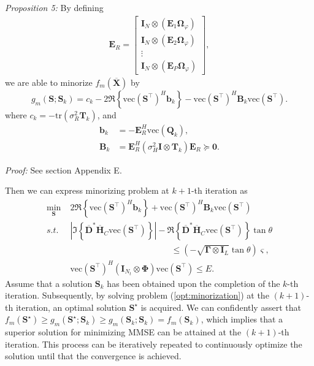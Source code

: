 \documentclass[lettersize,journal]{IEEEtran}
\newcommand{\nocolor}[1]{{\color{black}#1}}
\begin{document}
\textit{Proposition 5:} By defining 
\begin{equation}
\begin{aligned}
    \mathbf{E}_R
    = \begin{bmatrix}
        \mathbf{I}_N\otimes(\mathbf{E}_{1}\mathbf{\Omega}_{\varphi}) \\
        \mathbf{I}_N\otimes(\mathbf{E}_{2}\mathbf{\Omega}_{\varphi}) \\
        \vdots \\
        \mathbf{I}_N\otimes(\mathbf{E}_{P}\mathbf{\Omega}_{\varphi})
    \end{bmatrix},
\end{aligned}
\end{equation}
we are able to minorize $f_m(\overline{\mathbf{X}})$ by
\begin{equation}
    g_m(\mathbf{S};\mathbf{S}_k)=c_k - 2\Re\left\{\text{vec}(\mathbf{S}^{\top})^H\mathbf{b}_k\right\}-\text{vec}(\mathbf{S}^{\top})^H\mathbf{B}_k\text{vec}(\mathbf{S}^{\top}).
\end{equation}
where $c_k=-\text{tr}(\sigma_R^2\mathbf{T}_k)$,  and 
\begin{align}
    \mathbf{b}_k&=-\mathbf{E}_R^H\text{vec}(\mathbf{Q}_k), \label{eq:b}\\
    \mathbf{B}_k&=\mathbf{E}_R^H(\sigma_H^2\mathbf{I}\otimes\mathbf{T}_k)\mathbf{E}_R\succeq\mathbf{0}. \label{eq:B}
\end{align}

\textit{Proof:} \nocolor{See section Appendix E}.

Then we can express minorizing problem at $k+1$-th iteration as
\begin{equation}
\label{opt:minorization}
\begin{aligned}
    \underset{\mathbf{S}}{\min} &\;
    2\Re\left\{\text{vec}(\mathbf{S}^{\top})^H\mathbf{b}_k\right\}+\text{vec}(\mathbf{S}^{\top})^H\mathbf{B}_k\text{vec}(\mathbf{S}^{\top}) \\
    s.t. &\;
    \left| \Im\left\{\overline{\mathbf{D}}^{*}\overline{\mathbf{H}}_C\text{vec}(\mathbf{S}^{\top})\right\} \right| - \Re\left\{\overline{\mathbf{D}}^{*}\overline{\mathbf{H}}_C\text{vec}(\mathbf{S}^{\top})\right\}\tan\theta
    \\ &\qquad\qquad\qquad\qquad\qquad\qquad
    \leq (-\sqrt{\mathbf{\Gamma}\otimes\mathbf{I}_L}\tan\theta)\bm{\varsigma},\\
    &\; \text{vec}(\mathbf{S}^{\top})^H(\mathbf{I}_{N_t}\otimes\mathbf{\Phi})\text{vec}(\mathbf{S}^{\top})\leq E.
\end{aligned}
\end{equation}
Assume that a solution $\mathbf{S}_k$ has been obtained upon the completion of the $k$-th iteration. Subsequently, by solving problem (\ref{opt:minorization}) at the $(k+1)$-th iteration, an optimal solution $\mathbf{S}^{\star}$ is acquired. We can confidently assert that $f_m(\mathbf{S}^{\star})\geq g_m(\mathbf{S}^{\star};\mathbf{S}_k)\geq g_m(\mathbf{S}_k;\mathbf{S}_k)=f_m(\mathbf{S}_k)$, which implies that a superior solution for minimizing MMSE can be attained at the $(k+1)$-th iteration. This process can be iteratively repeated to continuously optimize the solution until that the convergence is achieved.
\end{document}
